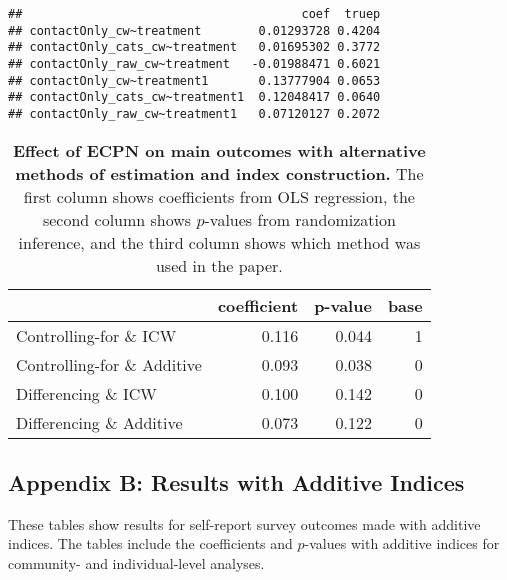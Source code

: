 \documentclass[
]{article}
\begin{document}
\begin{verbatim}
##                                       coef  truep
## contactOnly_cw~treatment        0.01293728 0.4204
## contactOnly_cats_cw~treatment   0.01695302 0.3772
## contactOnly_raw_cw~treatment   -0.01988471 0.6021
## contactOnly_cw~treatment1       0.13777904 0.0653
## contactOnly_cats_cw~treatment1  0.12048417 0.0640
## contactOnly_raw_cw~treatment1   0.07120127 0.2072
\end{verbatim}

\begin{table}[H]
\begin{center}

\begin{tabular}{l|r|r|r}
\hline
  & coefficient & p-value & base\\
\hline
Controlling-for \& ICW & 0.116 & 0.044 & 1\\
\hline
Controlling-for \& Additive & 0.093 & 0.038 & 0\\
\hline
Differencing \& ICW & 0.100 & 0.142 & 0\\
\hline
Differencing \& Additive & 0.073 & 0.122 & 0\\
\hline
\end{tabular}


\caption{\label{tab:attitude_tab}\textbf{Effect of ECPN on main outcomes with alternative methods of estimation and index construction.} The first column shows coefficients from OLS regression, the second column shows $p$-values from randomization inference, and the third column shows which method was used in the paper.}
\end{center}
\end{table}

\hypertarget{appendix-b-results-with-additive-indices}{%
\subsection{Appendix B: Results with Additive
Indices}\label{appendix-b-results-with-additive-indices}}

These tables show results for self-report survey outcomes made with
additive indices. The tables include the coefficients and \(p\)-values
with additive indices for community- and individual-level analyses.
\end{document}
